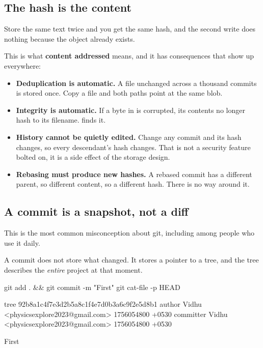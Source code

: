 \documentclass[11pt]{article}
\begin{document}
\subsection{The hash is the content}

Store the same text twice and you get the same hash, and the second write does
nothing because the object already exists.

This is what \textbf{content addressed} means, and it has consequences that show up
everywhere:

\begin{itemize}
  \item \textbf{Deduplication is automatic.} A file unchanged across a thousand
    commits is stored once. Copy a file and both paths point at the same blob.
  \item \textbf{Integrity is automatic.} If a byte in  is corrupted,
    its contents no longer hash to its filename.  finds it.
  \item \textbf{History cannot be quietly edited.} Change any commit and its hash
    changes, so every descendant's hash changes. That is not a security feature bolted
    on, it is a side effect of the storage design.
  \item \textbf{Rebasing must produce new hashes.} A rebased commit has a different
    parent, so different content, so a different hash. There is no way around it.
\end{itemize}

\subsection{A commit is a snapshot, not a diff}

This is the most common misconception about git, including among people who use it
daily.

A commit does not store what changed. It stores a pointer to a tree, and the tree
describes the \emph{entire} project at that moment.

\begin{shell}
git add . && git commit -m "First"
git cat-file -p HEAD
\end{shell}

\begin{terminal}
tree 92b8a1c4f7e3d2b5a8c1f4e7d0b3a6c9f2e5d8b1
author Vidhu <physicsexplore2023@gmail.com> 1756054800 +0530
committer Vidhu <physicsexplore2023@gmail.com> 1756054800 +0530

First
\end{terminal}
\end{document}
